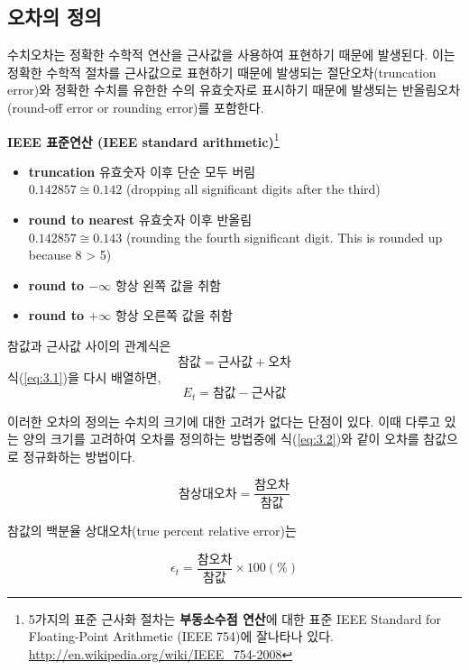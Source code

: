\clearpage
\subsection{오차의 정의}\label{sec:3-2}
수치오차는 정확한 수학적 연산을 근사값을 사용하여 표현하기 때문에 발생된다. 이는 정확한 수학적 절차를 근사값으로 표현하기 때문에 발생되는 절단오차(truncation error)와 정확한 수치를 유한한 수의 유효숫자로 표시하기 때문에 발생되는 반올림오차(round-off error or rounding error)를 포함한다.

\textbf{IEEE 표준연산 (IEEE standard arithmetic)}\footnote{5가지의 표준 근사화 절차는 \textbf{부동소수점 연산}에 대한 표준 IEEE Standard for Floating-Point Arithmetic (IEEE 754)에 잘나타나 있다. \url{http://en.wikipedia.org/wiki/IEEE_754-2008}}

\begin{itemize}
\item \textbf{truncation} 유효숫자 이후 단순 모두 버림 \\$0.142857\cong0.142$ (dropping all significant digits after the third)
\item \textbf{round to nearest} 유효숫자 이후 반올림 \\$0.142857\cong0.143$  (rounding the fourth significant digit. This is rounded up because 8 > 5)
\item \textbf{round to $-\infty$} 항상 왼쪽 값을 취함
\item \textbf{round to $+\infty$} 항상 오른쪽 값을 취함
\end{itemize}

참값과 근사값 사이의 관계식은
\begin{equation}
참값 = 근사값 + 오차
\label{eq:3.1}
\end{equation}
식(\ref{eq:3.1})을 다시 배열하면,
\begin{equation}
E_{t}=참값-근사값
\end{equation}

이러한 오차의 정의는 수치의 크기에 대한 고려가 없다는 단점이 있다. 이때 다루고 있는 양의 크기를 고려하여 오차를 정의하는 방법중에 식(\ref{eq:3.2})와 같이 오차를 참값으로 정규화하는 방법이다.

\begin{equation}
참상대오차=\frac{참오차}{참값}
\label{eq:3.2}
\end{equation}

참값의 백분율 상대오차(true percent relative error)는

\begin{equation}
\epsilon_{t}=\frac{참오차}{참값}\times 100 (\%)
\end{equation}

